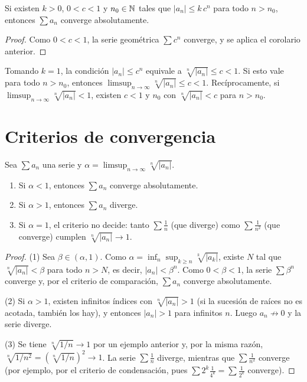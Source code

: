 \begin{corollary}
  Si existen \(k > 0\), \(0 < c < 1\) y \(n_0 \in \mathbb{N}\) tales que \(|a_n| \leq k\, c^n\) para todo \(n > n_0\), entonces \(\sum a_n\) converge absolutamente.
\end{corollary}

\begin{proof}
  Como \(0 < c < 1\), la serie geométrica \(\sum c^n\) converge, y se aplica el corolario anterior.
\end{proof}

\begin{note}
  Tomando \(k = 1\), la condición \(|a_n| \leq c^n\) equivale a \(\sqrt[n]{|a_n|} \leq c < 1\). Si esto vale para todo \(n > n_0\), entonces \(\limsup_{n \to \infty} \sqrt[n]{|a_n|} \leq c < 1\). Recíprocamente, si \(\limsup_{n \to \infty} \sqrt[n]{|a_n|} < 1\), existen \(c < 1\) y \(n_0\) con \(\sqrt[n]{|a_n|} < c\) para \(n > n_0\).
\end{note}

\section{Criterios de convergencia}

\begin{theorem}
  Sea \(\sum a_n\) una serie y \(\alpha = \limsup_{n \to \infty} \sqrt[n]{|a_n|}\).
  \begin{enumerate}[label=(\arabic*)]
    \item Si \(\alpha < 1\), entonces \(\sum a_n\) converge absolutamente.
    \item Si \(\alpha > 1\), entonces \(\sum a_n\) diverge.
    \item Si \(\alpha = 1\), el criterio no decide: tanto \(\sum \frac{1}{n}\) (que diverge) como \(\sum \frac{1}{n^2}\) (que converge) cumplen \(\sqrt[n]{|a_n|} \to 1\).
  \end{enumerate}
\end{theorem}

\begin{proof}
  (1) Sea \(\beta \in (\alpha, 1)\). Como \(\alpha = \inf_n \sup_{k \geq n} \sqrt[k]{|a_k|}\), existe \(N\) tal que \(\sqrt[n]{|a_n|} < \beta\) para todo \(n > N\), es decir, \(|a_n| < \beta^n\). Como \(0 < \beta < 1\), la serie \(\sum \beta^n\) converge y, por el criterio de comparación, \(\sum a_n\) converge absolutamente.

  (2) Si \(\alpha > 1\), existen infinitos índices con \(\sqrt[n]{|a_n|} > 1\) (si la sucesión de raíces no es acotada, también los hay), y entonces \(|a_n| > 1\) para infinitos \(n\). Luego \(a_n \not\to 0\) y la serie diverge.

  (3) Se tiene \(\sqrt[n]{1/n} \to 1\) por un ejemplo anterior y, por la misma razón, \(\sqrt[n]{1/n^2} = {(\sqrt[n]{1/n})}^2 \to 1\). La serie \(\sum \frac{1}{n}\) diverge, mientras que \(\sum \frac{1}{n^2}\) converge (por ejemplo, por el criterio de condensación, pues \(\sum 2^k \frac{1}{4^k} = \sum \frac{1}{2^k}\) converge).
\end{proof}


